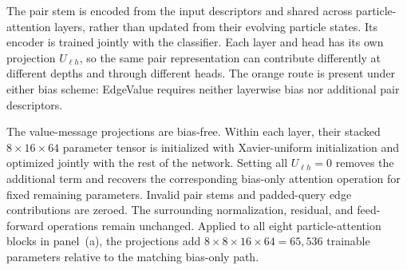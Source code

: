 The pair stem is encoded from the input descriptors and shared across
particle-attention layers, rather than updated from their evolving particle
states. Its encoder is trained jointly with the classifier. Each layer and
head has its own projection $U_{\ell h}$, so the same pair representation
can contribute differently at different depths and through different heads.
The orange route is present under either bias scheme: EdgeValue requires
neither layerwise bias nor additional pair descriptors.

The value-message projections are bias-free. Within each layer, their stacked
$8\times16\times64$ parameter tensor is initialized with Xavier-uniform
initialization and optimized jointly with the rest of the network. Setting all
$U_{\ell h}=0$ removes the additional term and recovers the corresponding
bias-only attention operation for fixed remaining parameters. Invalid pair
stems and padded-query edge contributions are zeroed. The surrounding
normalization, residual, and feed-forward operations remain unchanged.
Applied to all eight particle-attention blocks in panel~(a), the projections
add $8\times8\times16\times64=65{,}536$ trainable parameters relative to
the matching bias-only path.
